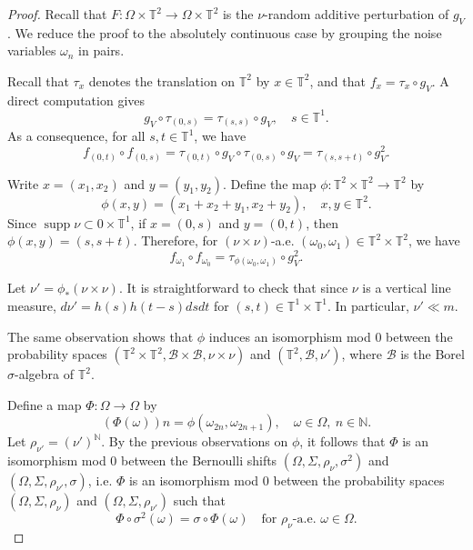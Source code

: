 \documentclass[a4paper,12pt,reqno]{amsart}
\numberwithin{equation}{section}
\newcommand{\cal}{\mathcal}
\newcommand{\BB}{{\cal B}}
\newcommand{\Nn}{{\mathbb{N}}}
\newcommand{\Tt}{{\mathbb{T}}}
\def\supp{\operatorname{supp}}
\begin{document}
\begin{proof}
Recall that $F \colon \Omega\times\Tt^2\to\Omega\times\Tt^2$ is the $\nu$-random additive perturbation of $g_V$. We reduce the proof to the absolutely continuous case by grouping the noise variables $\omega_n$ in pairs.

Recall that $\tau_x$ denotes the translation on $\Tt^2$ by $x \in \Tt^2$, and that $f_x = \tau_x \circ g_V$. A direct computation gives
\[
g_V \circ \tau_{(0,s)} = \tau_{(s,s)} \circ g_V, \quad s \in \Tt^1.
\]
As a consequence, for all $s,t \in \Tt^1$, we have
\begin{equation} \label{eq:two-steps}
f_{(0,t)} \circ f_{(0,s)} = \tau_{(0,t)} \circ g_V \circ \tau_{(0,s)} \circ g_V  = \tau_{(s,s+t)} \circ g^2_V.
\end{equation}

Write $x=(x_1,x_2)$ and $y=(y_1,y_2)$. Define the map $\phi \colon \Tt^2\times\Tt^2\to\Tt^2$ by
\[
\phi(x,y)=(x_1+x_2+y_1,x_2+y_2), \quad x,y \in \Tt^2.
\]
Since $\supp \nu \subset {0}\times \Tt^1$, if $x=(0,s)$ and $y=(0,t)$, then $\phi(x,y)=(s,s+t)$. Therefore, for $(\nu \times \nu)$-a.e. $(\omega_0,\omega_1) \in \Tt^2 \times \Tt^2$, we have
\[
f_{\omega_1} \circ f_{\omega_0} = \tau_{\phi(\omega_0,\omega_1)} \circ g^2_V.
\]

Let $\nu'=\phi_*(\nu\times\nu)$. It is straightforward to check that since $\nu$ is a vertical line measure,  $d\nu' = h(s)h(t-s)dsdt$ for $(s,t) \in \Tt^1 \times \Tt^1$. In particular, $\nu' \ll m$. 

The same observation shows that $\phi$ induces an isomorphism mod $0$ between the probability spaces $(\Tt^2\times\Tt^2,\BB\times\BB,\nu\times\nu)$ and $(\Tt^2,\BB,\nu')$, where $\BB$ is the Borel $\sigma$-algebra of $\Tt^2$.

Define a map $\Phi \colon \Omega \to \Omega$ by
\[
(\Phi(\omega))n =\phi(\omega_{2n},\omega_{2n+1}),
\quad
\omega \in \Omega,\ n \in \Nn.
\]
Let $\rho_{\nu'}=(\nu')^{\Nn}$. By the previous observations on $\phi$, it follows that $\Phi$ is an isomorphism mod $0$ between the Bernoulli shifts $(\Omega,\Sigma,\rho_\nu,\sigma^2)$ and $(\Omega,\Sigma,\rho_{\nu'},\sigma)$, i.e. $\Phi$ is an isomorphism mod $0$ between the probability spaces $(\Omega,\Sigma,\rho_\nu)$ and $(\Omega,\Sigma,\rho_{\nu'})$ such that
\[
\Phi \circ \sigma^2(\omega) = \sigma \circ \Phi(\omega) \quad \text{for } \rho_\nu \text{-a.e. } \omega \in \Omega.
\]


\end{proof}
\end{document}
